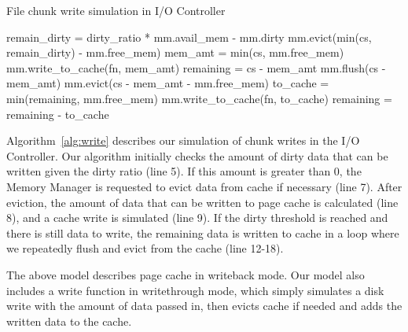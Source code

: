 \begin{algorithm}\caption{File chunk write simulation in I/O Controller}
\label{alg:write}
    \small
    \begin{algorithmic}[1]
        \Input
           \EndInput
        \State remain\_dirty = dirty\_ratio * mm.avail\_mem - mm.dirty
         
            \State mm.evict(min(cs, remain\_dirty) - mm.free\_mem)
            \State mem\_amt = min(cs, mm.free\_mem)
            \State mm.write\_to\_cache(fn, mem\_amt)
        \EndIf
        \State remaining = cs - mem\_amt
          
            \State mm.flush(cs - mem\_amt)
            \State mm.evict(cs - mem\_amt  - mm.free\_mem)
            \State to\_cache = min(remaining, mm.free\_mem)
            \State mm.write\_to\_cache(fn, to\_cache)
            \State remaining = remaining - to\_cache
        \EndWhile

    \end{algorithmic}
\end{algorithm}
Algorithm~\ref{alg:write} describes our simulation of chunk writes in
the I/O Controller.
Our algorithm initially checks the  amount of dirty data that
can be written given the dirty ratio (line 5).
If this amount is greater than 0, the Memory Manager is requested to evict
data from cache if necessary (line 7).
After eviction, the amount of data that can be written to
page cache is calculated (line 8), and a cache write is simulated (line 9).
If the dirty threshold is reached and there is still data to write,
the remaining data is written to cache in a loop
where we repeatedly flush and evict from the cache (line 12-18).

The above model describes page cache in writeback
mode. Our model also includes a write function in writethrough mode,
which simply simulates a disk write with the amount of data passed in,
then evicts cache if needed and adds the written data to the cache.